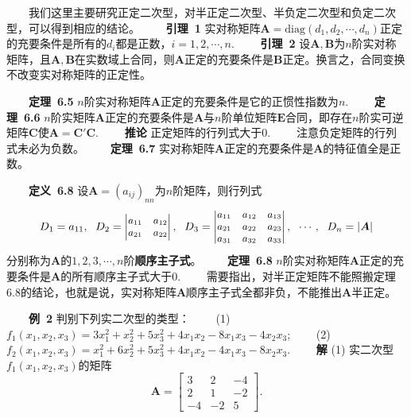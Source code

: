 \documentclass[compress,mathserif,cjk]{beamer}
\theoremstyle{remark}
\numberwithin{equation}{section}
\newcommand{\hei}{\bf}      %
\begin{document}
\begin{CJK}{UTF8}{gbsn}
\begin{frame}
\ \ \ \ 我们这里主要研究正定二次型，对半正定二次型、半负定二次型和负定二次型，可以得到相应的结论。
\pause\vskip 5pt
\ \ \ \  {\hei 引理~1} 实对称矩阵$\bm A=\mathrm{diag}(d_1,d_2,\cdots,d_n)$正定的充要条件是所有的$d_i$都是正数，$i=1,2,\cdots,n$.
\pause\vskip 10pt
\ \ \ \  {\hei 引理~2} 设$\bm A,\bm B$为$n$阶实对称矩阵，且$\bm A,\bm B$在实数域上合同，则$\bm A$正定的充要条件是$\bm B$正定。换言之，合同变换不改变实对称矩阵的正定性。
\end{frame}
\begin{frame}
\ \ \ \  {\hei 定理~6.5} $n$阶实对称矩阵$\bm A$正定的充要条件是它的正惯性指数为$n$.
\pause\vskip 10pt
\ \ \ \  {\hei 定理~6.6} $n$阶实矩阵$\bm A$正定的充要条件是$\bm A$与$n$阶单位矩阵$\bm E$合同，即存在$n$阶实可逆矩阵$\bm C$使$\bm A=\bm C'\bm C$.
\pause\vskip 10pt
\ \ \ \  {\hei 推论} 正定矩阵的行列式大于0.
\vskip 10pt
\ \ \ \  注意负定矩阵的行列式未必为负数。
\pause\vskip 10pt
\ \ \ \  {\hei 定理~6.7} 实对称矩阵$\bm A$正定的充要条件是$\bm A$的特征值全是正数。
\end{frame}
\begin{frame}
\ \ \ \ {\hei 定义~6.8} 设$\bm A=(a_{ij})_{nn}$为$n$阶矩阵，则行列式
$$\small D_1=a_{11},~~D_2=\left|\begin{matrix}a_{11}&a_{12}\\a_{21}&a_{22}\end{matrix}\right|,~~
D_3=\left|\begin{matrix}a_{11}&a_{12}&a_{13}\\a_{21}&a_{22}&a_{23}\\a_{31}&a_{32}&a_{33}\end{matrix}\right|,~~\cdots,~~D_n=|\bm A|$$
分别称为$\bm A$的$1,2,3,\cdots,n$阶{\hei 顺序主子式}。
\pause\vskip 10pt
\ \ \ \ {\hei 定理~6.8} $n$阶实对称矩阵$\bm A$正定的充要条件是$\bm A$的所有顺序主子式大于0.
\pause\vskip 10pt
\ \ \ \ 需要指出，对半正定矩阵不能照搬定理6.8的结论，也就是说，实对称矩阵$\bm A$顺序主子式全都非负，不能推出$\bm A$半正定。
\end{frame}
\begin{frame}
\ \ \ \ {\hei 例~2} 判别下列实二次型的类型：
\vskip 5pt
\ \ \ \ (1) $f_1(x_1,x_2,x_3)=3x_1^2+x_2^2+5x_3^2+4x_1x_2-8x_1x_3-4x_2x_3$;
\vskip 5pt
\ \ \ \ (2) $f_2(x_1,x_2,x_3)=x_1^2+6x_2^2+5x_3^2+4x_1x_2-4x_1x_3-8x_2x_3$.
\pause\vskip 10pt
\ \ \ \ {\hei 解} (1) 实二次型$f_1(x_1,x_2,x_3)$的矩阵
$$\bm A=\left[\begin{matrix}3&2&-4\\2&1&-2\\-4&-2&5\end{matrix}\right].$$

\end{frame}
\end{CJK}
\end{document}
